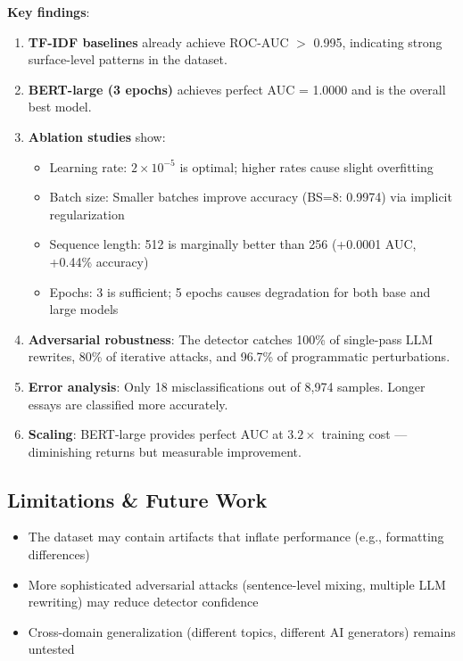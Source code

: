\documentclass[11pt,a4paper]{article}
\begin{document}
\textbf{Key findings}:
\begin{enumerate}
\item \textbf{TF-IDF baselines} already achieve ROC-AUC $>$ 0.995, indicating strong surface-level patterns in the dataset.
\item \textbf{BERT-large (3 epochs)} achieves perfect AUC = 1.0000 and is the overall best model.
\item \textbf{Ablation studies} show:
  \begin{itemize}[nosep]
  \item Learning rate: $2\times10^{-5}$ is optimal; higher rates cause slight overfitting
  \item Batch size: Smaller batches improve accuracy (BS=8: 0.9974) via implicit regularization
  \item Sequence length: 512 is marginally better than 256 (+0.0001 AUC, +0.44\% accuracy)
  \item Epochs: 3 is sufficient; 5 epochs causes degradation for both base and large models
  \end{itemize}
\item \textbf{Adversarial robustness}: The detector catches 100\% of single-pass LLM rewrites, 80\% of iterative attacks, and 96.7\% of programmatic perturbations.
\item \textbf{Error analysis}: Only 18 misclassifications out of 8,974 samples. Longer essays are classified more accurately.
\item \textbf{Scaling}: BERT-large provides perfect AUC at $3.2\times$ training cost --- diminishing returns but measurable improvement.
\end{enumerate}

\subsection{Limitations \& Future Work}
\begin{itemize}[nosep]
\item The dataset may contain artifacts that inflate performance (e.g., formatting differences)
\item More sophisticated adversarial attacks (sentence-level mixing, multiple LLM rewriting) may reduce detector confidence
\item Cross-domain generalization (different topics, different AI generators) remains untested
\end{itemize}

\end{document}
